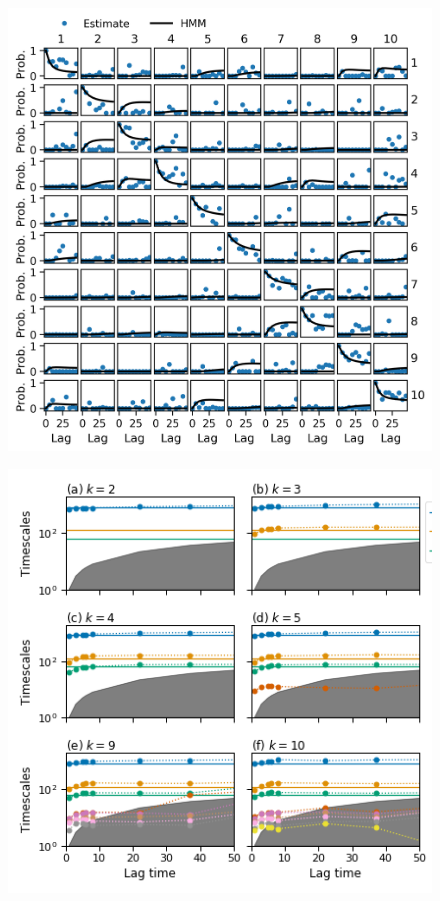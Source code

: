 \begin{figure}
    \centering
    \includegraphics{chapters/hmm_selection/figures/ck_test_5_10.png}
    \label{fig:prinz_ck_test_5_10}
\end{figure}

\begin{figure}
    \centering
    \includegraphics{chapters/hmm_selection/figures/its_tau_5.png}
    \label{fig:prinz_its_tau_5}
\end{figure}